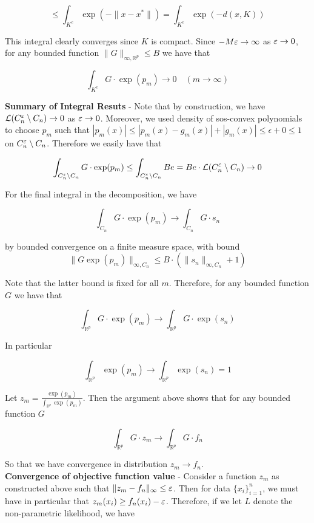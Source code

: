 \documentclass[11pt,reqno]{amsart}
\numberwithin{equation}{section}
\newcommand{\lft}{\left(}
\newcommand{\rt}{\right)}
\newcommand{\mr}{\mathbb{R}}
\newcommand{\tb}{\textbf}
\newcommand{\mc}{\mathcal}
\begin{document}
\[
\leq \int_{K^c} \exp \lft -\|x - x^*\| \rt  = \int_{K^c} \exp \lft -d(x,K) \rt 
\]

This integral clearly converges since $K$ is compact. Since $-M \varepsilon \rightarrow \infty$ as $\varepsilon \rightarrow 0$, for any bounded function $\|G\|_{\infty, \mr^p} \leq B$ we have that 

\[
\int_{K^c} G \cdot \exp (p_m)  \to 0 \quad (m \to \infty) 
\]

\tb{Summary of Integral Resuts} - Note that by construction, we have $\mc{L}(C_n^{\eps} \setminus C_n) \to 0$ as $\varepsilon \rightarrow 0$. Moreover, we used density of sos-convex polynomials to choose $p_m$ such that $|p_m(x)| \leq |p_m(x) - g_m(x)| + |g_m(x)| \leq \epsilon + 0 \leq 1$ on $C_n^{\varepsilon} \setminus C_n$. Therefore we easily have that 

\[
\int_{C_n^{\eps} \setminus C_n} G \cdot \exp(p_m) \leq \int_{C_n^{\eps} \setminus C_n} Be = Be \cdot \mc{L}(C_n^{\eps} \setminus C_n) \to 0
\]

For the final integral in the decomposition, we have 

\[
\int_{C_n} G \cdot \exp(p_m) \to \int_{C_n} G \cdot s_n
\]

by bounded convergence on a finite measure space, with bound \\

\[
\|G \exp(p_m) \|_{\infty, C_n} \leq B \cdot (\|s_n\|_{\infty, C_n} + 1) 
\]

 Note that the latter bound is fixed for all $m$. Therefore, for any bounded function $G$ we have that 

\[
\int_{\mr^p} G\cdot \exp(p_m) \to \int_{\mr^p} G \cdot \exp(s_n) 
\]

In particular 

\[
\int_{\mr^p} \exp(p_m) \to \int_{\mr^p} \exp(s_n ) = 1
\]

Let $z_m = \frac{\exp(p_m)}{\int_{\mr^p} \exp(p_m)} $. Then the argument above shows that for any bounded function $G$

\[
\int_{\mr^p} G\cdot z_m \to \int_{\mr^p} G \cdot f_n
\]

So that we have convergence in distribution $z_m \to f_n$. \\

\tb{Convergence of objective function value} - Consider a function $z_m$ as constructed above such that $\|z_m - f_n\|_{\infty} \leq \varepsilon$. Then for data $\{x_i\}_{i = 1}^n$, we must have in particular that $z_m(x_i) \geq f_n(x_i) - \varepsilon$. Therefore, if we let $L$ denote the non-parametric likelihood, we have 
\end{document}

